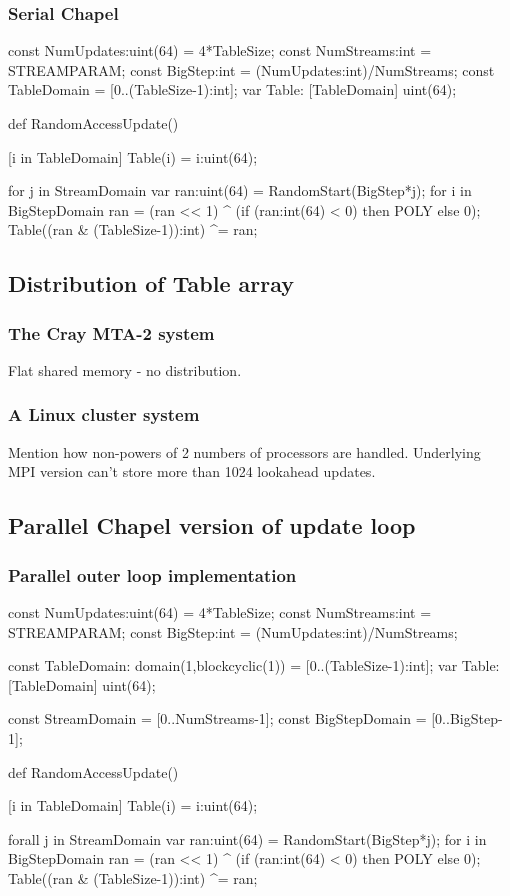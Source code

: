 \subsubsection{Serial Chapel}
\begin{chapel}
const NumUpdates:uint(64) = 4*TableSize;
const NumStreams:int = STREAMPARAM;
const BigStep:int = (NumUpdates:int)/NumStreams;
const TableDomain = [0..(TableSize-1):int];
var Table: [TableDomain] uint(64);

def RandomAccessUpdate() {

  [i in TableDomain] Table(i) = i:uint(64);

  for j in StreamDomain {
    var ran:uint(64) = RandomStart(BigStep*j);
    for i in BigStepDomain {
      ran = (ran << 1) ^ (if (ran:int(64) < 0) then POLY else 0);
      Table((ran & (TableSize-1)):int) ^= ran;
    }
  }
}
\end{chapel}

\subsection{Distribution of Table array}
\subsubsection{The Cray MTA-2 system}
Flat shared memory - no distribution.
\subsubsection{A Linux cluster system}
Mention how non-powers of 2 numbers of processors are handled.  Underlying
MPI version can't store more than 1024 lookahead updates.

\subsection{Parallel Chapel version of update loop}

\subsubsection{Parallel outer loop implementation}

\begin{chapel}
const NumUpdates:uint(64) = 4*TableSize;
const NumStreams:int = STREAMPARAM;
const BigStep:int = (NumUpdates:int)/NumStreams;

const TableDomain: domain(1,blockcyclic(1)) = [0..(TableSize-1):int];
var Table: [TableDomain] uint(64);

const StreamDomain = [0..NumStreams-1];
const BigStepDomain = [0..BigStep-1];

def RandomAccessUpdate() {

  [i in TableDomain] Table(i) = i:uint(64);

  forall j in StreamDomain {
    var ran:uint(64) = RandomStart(BigStep*j);
    for i in BigStepDomain {
      ran = (ran << 1) ^ (if (ran:int(64) < 0) then POLY else 0);
      Table((ran & (TableSize-1)):int) ^= ran;
    }
  }
}
\end{chapel}

